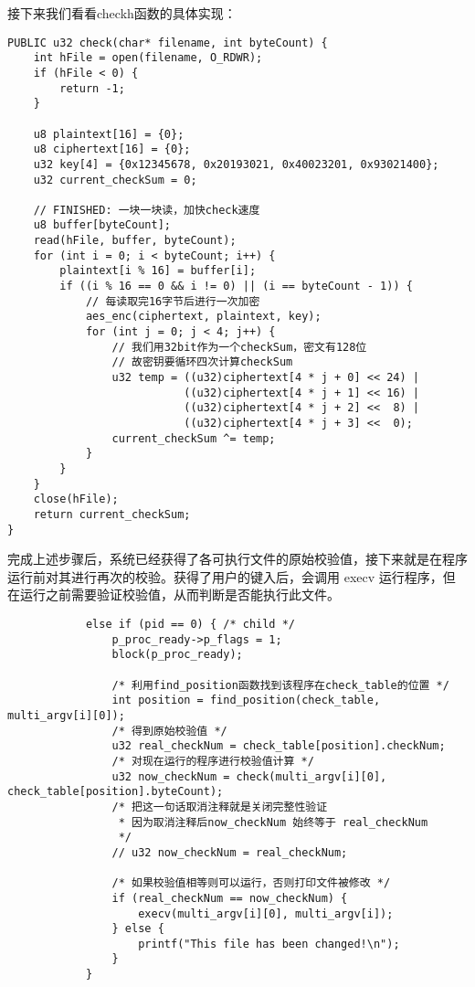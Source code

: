 \documentclass{whureport}
\begin{document}
接下来我们看看checkh函数的具体实现：
\begin{lstlisting}
PUBLIC u32 check(char* filename, int byteCount) {
    int hFile = open(filename, O_RDWR);
    if (hFile < 0) {
        return -1;
    }

    u8 plaintext[16] = {0};
    u8 ciphertext[16] = {0};
    u32 key[4] = {0x12345678, 0x20193021, 0x40023201, 0x93021400};
    u32 current_checkSum = 0;

    // FINISHED: 一块一块读，加快check速度
    u8 buffer[byteCount];
    read(hFile, buffer, byteCount);
    for (int i = 0; i < byteCount; i++) {
        plaintext[i % 16] = buffer[i];
        if ((i % 16 == 0 && i != 0) || (i == byteCount - 1)) {
        	// 每读取完16字节后进行一次加密
            aes_enc(ciphertext, plaintext, key);
            for (int j = 0; j < 4; j++) {
            	// 我们用32bit作为一个checkSum，密文有128位
            	// 故密钥要循环四次计算checkSum
                u32 temp = ((u32)ciphertext[4 * j + 0] << 24) |
                           ((u32)ciphertext[4 * j + 1] << 16) |
                           ((u32)ciphertext[4 * j + 2] <<  8) |
                           ((u32)ciphertext[4 * j + 3] <<  0);
                current_checkSum ^= temp;
            }
        }
    }
    close(hFile);
    return current_checkSum;
}
\end{lstlisting}

完成上述步骤后，系统已经获得了各可执行文件的原始校验值，接下来就是在程序运行前对其进行再次的校验。获得了用户的键入后，会调用 execv 运行程序，但在运行之前需要验证校验值，从而判断是否能执行此文件。

\begin{lstlisting}
            else if (pid == 0) { /* child */
                p_proc_ready->p_flags = 1;
                block(p_proc_ready);

				/* 利用find_position函数找到该程序在check_table的位置 */
                int position = find_position(check_table, multi_argv[i][0]);
                /* 得到原始校验值 */
                u32 real_checkNum = check_table[position].checkNum;
                /* 对现在运行的程序进行校验值计算 */
                u32 now_checkNum = check(multi_argv[i][0], check_table[position].byteCount);
                /* 把这一句话取消注释就是关闭完整性验证
                 * 因为取消注释后now_checkNum 始终等于 real_checkNum
                 */
                // u32 now_checkNum = real_checkNum;

				/* 如果校验值相等则可以运行，否则打印文件被修改 */
                if (real_checkNum == now_checkNum) {
                    execv(multi_argv[i][0], multi_argv[i]);
                } else {
                    printf("This file has been changed!\n");
                }
            }
\end{lstlisting}
\end{document}
